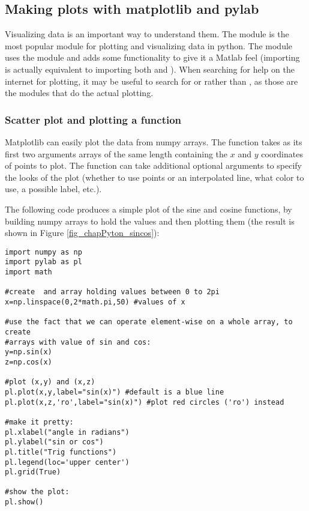 \subsection{Making plots with matplotlib and pylab}
Visualizing data is an important way to understand them. The  module is the most popular module for plotting and visualizing data in python. The  module uses the  module and adds some functionality to give it a Matlab feel (importing  is actually equivalent to importing both  and ). When searching for help on the internet for plotting, it may be useful to search for  or  rather than , as those are the modules that do the actual plotting.

\subsubsection{Scatter plot and plotting a function}
Matplotlib can easily plot the data from numpy arrays. The  function takes as its first two arguments arrays of the same length containing the $x$ and $y$ coordinates of points to plot. The function can take additional optional arguments to specify the looks of the plot (whether to use points or an interpolated line, what color to use, a possible label, etc.).

The following code produces a simple plot of the sine and cosine functions, by building numpy arrays to hold the values and then plotting them (the result is shown in Figure \ref{fig_chapPyton_sincos}):

\begin{lstlisting}[frame=single] 
import numpy as np
import pylab as pl
import math 

#create  and array holding values between 0 to 2pi
x=np.linspace(0,2*math.pi,50) #values of x

#use the fact that we can operate element-wise on a whole array, to create
#arrays with value of sin and cos:
y=np.sin(x)
z=np.cos(x)

#plot (x,y) and (x,z)
pl.plot(x,y,label="sin(x)") #default is a blue line
pl.plot(x,z,'ro',label="sin(x)") #plot red circles ('ro') instead

#make it pretty:
pl.xlabel("angle in radians")
pl.ylabel("sin or cos")
pl.title("Trig functions")
pl.legend(loc='upper center')
pl.grid(True)

#show the plot:
pl.show()

\end{lstlisting} 

